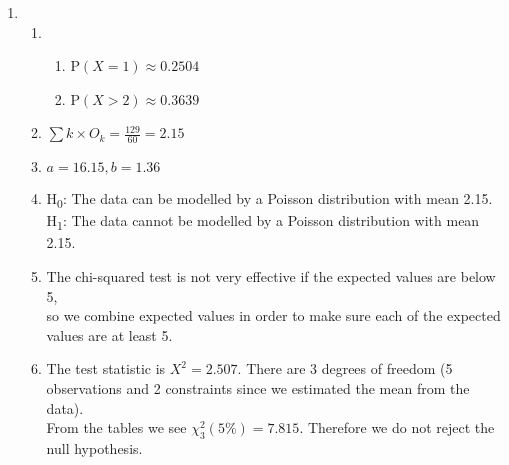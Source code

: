 \documentclass[fleqn]{article}
\begin{document}
\begin{enumerate}
    \item \begin{enumerate}[label=\bfseries \alph*\space ]    
            \item \begin{enumerate}[label=\bfseries \roman*\space ]
                    \item P$(X=1)\approx 0.2504$
                    \item P$(X>2)\approx 0.3639$
                \end{enumerate}
            \item $\sum k\times O_k = \tfrac{129}{60}=2.15$
            \item $a=16.15, b=1.36$
            \item H\textsubscript{0}: The data can be modelled by a Poisson distribution with mean 2.15. \\
                H\textsubscript{1}: The data cannot be modelled by a Poisson distribution with mean 2.15.
            \item The chi-squared test is not very effective if the expected values are below 5, \\
                so we combine expected values in order to make sure each of the expected values are at least 5.
            \item The test statistic is $X^2=2.507$. There are 3 degrees of freedom (5 observations and 2 constraints since we estimated the mean from the data). \\
                From the tables we see $\chi_3^2(5\%)=7.815$. Therefore we do not reject the null hypothesis.
        \end{enumerate}
    

\end{enumerate}
\end{document}
